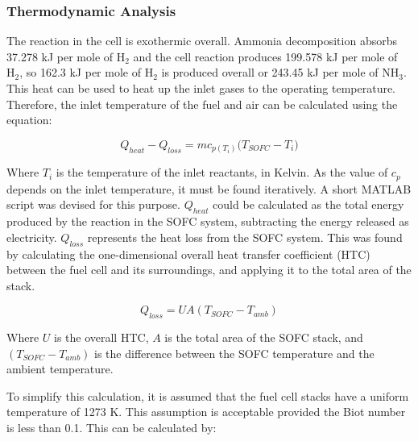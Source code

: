 \documentclass{article}
\begin{document}
     \hspace{1cm}\\
     \hspace{1cm}\\
     \hspace{1cm}\\
     \hspace{1cm}\\
     \hspace{1cm}\\
        

    \subsubsection{Thermodynamic Analysis}
        The reaction in the cell is exothermic overall. Ammonia decomposition absorbs 37.278 kJ per mole of $\text{H}_{2}$ and the cell reaction produces 199.578 kJ per mole of $\text{H}_{2}$, so 162.3 kJ per mole of $\text{H}_{2}$ is produced overall \text{-} or 243.45 kJ per mole of $\text{NH}_{3}$. This heat can be used to heat up the inlet gases to the operating temperature. Therefore, the inlet temperature of the fuel and air can be calculated using the equation:
        
\begin{equation}
Q_{heat}- Q_{loss}=mc_{p(T_i)}  (T_{SOFC}-{ T_i)} 	
\label{LMeq:inlettemp}
\end{equation}

Where $T_i$ is the temperature of the inlet reactants, in Kelvin. As the value of $c_p$ depends on the inlet temperature, it must be found iteratively. A short MATLAB script was devised for this purpose. $Q_{heat}$ could be calculated as the total energy produced by the reaction in the SOFC system, subtracting the energy released as electricity.
 $Q_{loss}$ represents the heat loss from the SOFC system. This was found by calculating the one-dimensional overall heat transfer coefficient (HTC) between the fuel cell and its surroundings, and applying it to the total area of the stack.
 
 \begin{equation}
 Q_{loss}=UA(T_{SOFC}- T_{amb})
 \label{LMeq:heatlosscell}
 \end{equation}
 
Where $U$ is the overall HTC, $A$ is the total area of the SOFC stack, and $(T_{SOFC}- T_{amb})$ is the difference between the SOFC temperature and the ambient temperature.


To simplify this calculation, it is assumed that the fuel cell stacks have a uniform temperature of 1273 K. This assumption is acceptable provided the Biot number is less than 0.1. This can be calculated by:
\end{document}
